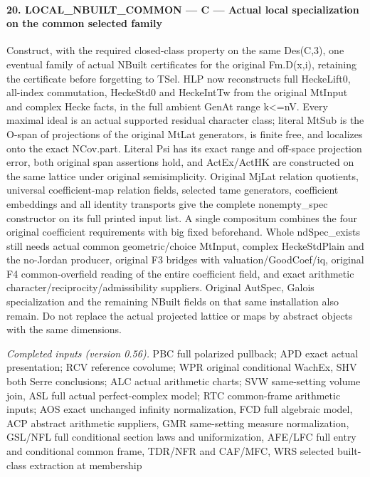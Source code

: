 \documentclass[11pt,a4paper]{article}
\numberwithin{equation}{section}
\theoremstyle{remark}\newtheorem{remark}[theorem]{Remark}
\begin{document}
\paragraph{20. LOCAL\_\allowbreak NBUILT\_\allowbreak COMMON — C — Actual local specialization on the common selected family}

Construct, with the required closed-class property on the same Des(C,3), one eventual family of actual NBuilt certificates for the original Fm.D(x,i), retaining the certificate before forgetting to TSel. HLP now reconstructs full HeckeLift0, all-index commutation, HeckeStd0 and HeckeIntTw from the original MtInput and complex Hecke facts, in the full ambient GenAt range k<=nV. Every maximal ideal is an actual supported residual character class; literal MtSub is the O-span of projections of the original MtLat generators, is finite free, and localizes onto the exact NCov.part. Literal Psi has its exact range and off-space projection error, both original span assertions hold, and ActEx/ActHK are constructed on the same lattice under original semisimplicity. Original MjLat relation quotients, universal coefficient-map relation fields, selected tame generators, coefficient embeddings and all identity transports give the complete nonempty\_\allowbreak spec constructor on its full printed input list. A single compositum combines the four original coefficient requirements with big fixed beforehand. Whole ndSpec\_\allowbreak exists still needs actual common geometric/choice MtInput, complex HeckeStdPlain and the no-Jordan producer, original F3 bridges with valuation/GoodCoef/iq, original F4 common-overfield reading of the entire coefficient field, and exact arithmetic character/reciprocity/admissibility suppliers. Original AutSpec, Galois specialization and the remaining NBuilt fields on that same installation also remain. Do not replace the actual projected lattice or maps by abstract objects with the same dimensions.

\emph{Completed inputs (version 0.56).} PBC full polarized pullback; APD exact actual presentation; RCV reference covolume; WPR original conditional WachEx, SHV both Serre conclusions; ALC actual arithmetic charts; SVW same-setting volume join, ASL full actual perfect-complex model; RTC common-frame arithmetic inputs; AOS exact unchanged infinity normalization, FCD full algebraic model, ACP abstract arithmetic suppliers, GMR same-setting measure normalization, GSL/NFL full conditional section laws and uniformization, AFE/LFC full entry and conditional common frame, TDR/NFR and CAF/MFC, WRS selected built-class extraction at membership
\end{document}
